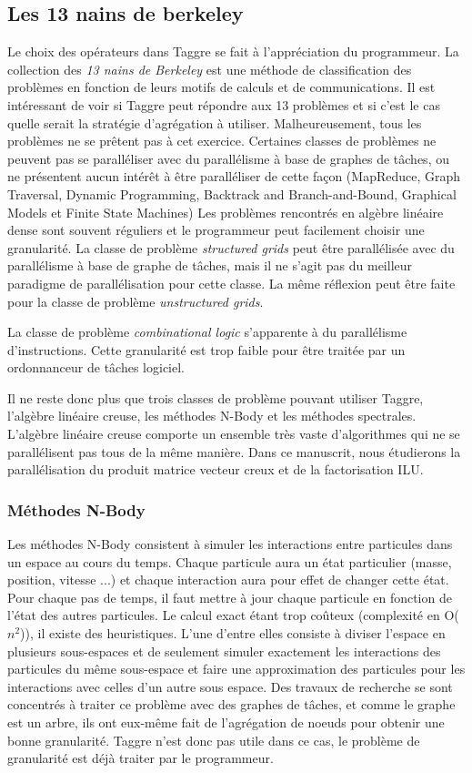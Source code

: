 \subsection{Les 13 nains de berkeley}
Le choix des opérateurs dans Taggre se fait à l'appréciation du programmeur.
%
La collection des {\em 13 nains de Berkeley}\cite{dwarfs} est une méthode de classification des problèmes en fonction de leurs motifs de calculs et de communications.
%
Il est intéressant de voir si Taggre peut répondre aux 13 problèmes et si c'est le cas quelle serait la stratégie d'agrégation à utiliser.
%
Malheureusement, tous les problèmes ne se prêtent pas à cet exercice.
%
Certaines classes de problèmes ne peuvent pas se paralléliser avec du parallélisme à base de graphes de tâches, ou ne présentent aucun intérêt à être paralléliser de cette façon (MapReduce, Graph Traversal, Dynamic Programming, Backtrack and Branch-and-Bound, Graphical Models et Finite State Machines)
%
Les problèmes rencontrés en algèbre linéaire dense sont souvent réguliers et le programmeur peut facilement choisir une granularité.
%
La classe de problème {\em structured grids} peut être parallélisée avec du parallélisme à base de graphe de tâches, mais il ne s'agit pas du meilleur paradigme de parallélisation pour cette classe.
%
La même réflexion peut être faite pour la classe de problème {\em unstructured grids}.


La classe de problème {\em combinational logic} s'apparente à du parallélisme d'instructions.
%
Cette granularité est trop faible pour être traitée par un ordonnanceur de tâches logiciel.

Il ne reste donc plus que trois classes de problème pouvant utiliser Taggre, l'algèbre linéaire creuse, les méthodes N-Body et les méthodes spectrales.
%
L'algèbre linéaire creuse comporte un ensemble très vaste d'algorithmes qui ne se parallélisent pas tous de la même manière.
%
Dans ce manuscrit, nous étudierons la parallélisation du produit matrice vecteur creux et de la factorisation ILU.


\subsubsection{Méthodes N-Body}
Les méthodes N-Body consistent à simuler les interactions entre particules dans un espace au cours du temps.
%
Chaque particule aura un état particulier (masse, position, vitesse ...) et chaque interaction aura pour effet de changer cette état.
%
Pour chaque pas de temps, il faut mettre à jour chaque particule en fonction de l'état des autres particules.
%
Le calcul exact étant trop coûteux (complexité en O($n^2$)), il existe des heuristiques.
%
L'une d'entre elles consiste à diviser l'espace en plusieurs sous-espaces et de seulement simuler exactement les interactions des particules du même sous-espace et faire une approximation des particules pour les interactions avec celles d'un autre sous espace.
%
Des travaux de recherche se sont concentrés à traiter ce problème avec des graphes de tâches\cite{scalfmm}, et comme le graphe est un arbre, ils ont eux-même fait de l'agrégation de noeuds pour obtenir une bonne granularité.
%
Taggre n'est donc pas utile dans ce cas, le problème de granularité est déjà traiter par le programmeur.


